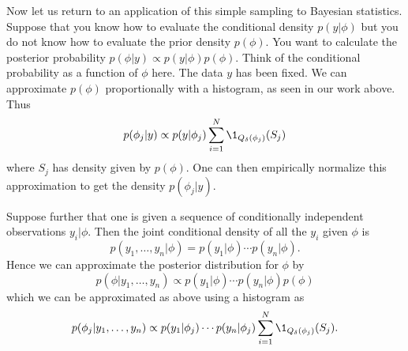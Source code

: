 \documentclass{report}
\begin{document}
Now let us return to an application of this simple sampling to Bayesian statistics.  Suppose that you know how to evaluate the conditional density $p(y|\phi)$ but you do not know how to evaluate the prior density $p(\phi)$.  You want to calculate the posterior probability $p(\phi | y) \propto p(y | \phi) p(\phi)$.  Think of the conditional probability as a function of $\phi$ here.  The data $y$ has been fixed.  We can approximate $p(\phi)$ proportionally with a histogram, as seen in our work above.  Thus
\[
p(\phi_j | y) \propto p(y|\phi_j) \sum_{i=1}^N \1_{Q_\delta(\phi_j)}(S_j)
\]
where $S_j$ has density given by $p(\phi)$.  One can then empirically normalize this approximation to get the density $p(\phi_j | y)$.

Suppose further that one is given a sequence of conditionally independent observations $y_i | \phi$.  Then the joint conditional density of all the $y_i$ given $\phi$ is
\[
p(y_1, \ldots, y_n | \phi) = p(y_1 | \phi) \cdots p(y_n | \phi).
\]
Hence we can approximate the posterior distribution for $\phi$ by
\[
p(\phi | y_1, \ldots, y_n) \propto p(y_1 | \phi) \cdots p(y_n | \phi) p(\phi)
\]
which we can be approximated as above using a histogram as
\[
p(\phi_j | y_1, \ldots, y_n) \propto p(y_1 | \phi_j) \cdots p(y_n | \phi_j) \sum_{i=1}^N \1_{Q_\delta(\phi_j)}(S_j).
\]
\end{document}
